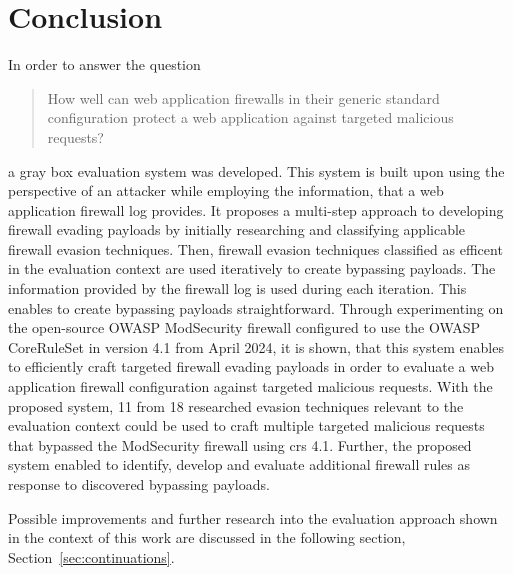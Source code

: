 \section{Conclusion}
\label{sec:conclusion}
In order to answer the question
\begin{quote}
	How well can web application firewalls in their generic standard configuration
	protect a web application against targeted malicious requests?
\end{quote}
a gray box evaluation system was developed.
This system is built upon using the perspective of an attacker while employing the information, that a web application firewall log provides.
It proposes a multi-step approach to developing firewall evading payloads by initially researching and classifying applicable firewall evasion techniques.
Then, firewall evasion techniques classified as efficent in the evaluation context are used iteratively to create bypassing payloads. The information provided by the firewall log is used during each iteration. This enables to create bypassing payloads straightforward.
Through experimenting on the open-source OWASP ModSecurity firewall configured to use the OWASP CoreRuleSet in version 4.1 from April 2024, it is shown, that this system enables to efficiently craft targeted firewall evading payloads in order to evaluate a web application firewall configuration against targeted malicious requests.
With the proposed system, 11 from 18 researched evasion techniques relevant to the evaluation context could be used to craft multiple targeted malicious requests that bypassed the ModSecurity firewall using \acrshort{crs} 4.1.
Further, the proposed system enabled to identify, develop and evaluate additional firewall rules as response to discovered bypassing payloads.

Possible improvements and further research into the evaluation approach shown in the context of this work are discussed in the following section, Section~\ref{sec:continuations}.
